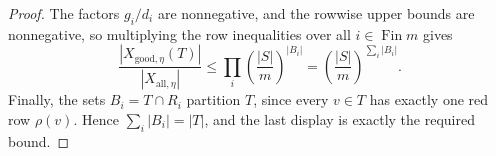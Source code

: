 \begin{proof}
The factors \(g_i/d_i\) are nonnegative, and the rowwise upper bounds are
nonnegative, so multiplying the row inequalities over all
\(i\in\operatorname{Fin}m\) gives
\[
\frac{|X_{\mathrm{good},\eta}(T)|}{|X_{\mathrm{all},\eta}|}
\le
\prod_i \left(\frac{|S|}{m}\right)^{|B_i|}
=
\left(\frac{|S|}{m}\right)^{\sum_i |B_i|}.
\]
Finally, the sets \(B_i=T\cap R_i\) partition \(T\), since every
\(v\in T\) has exactly one red row \(\rho(v)\).  Hence
\(\sum_i |B_i|=|T|\), and the last display is exactly the required bound.
\end{proof}
